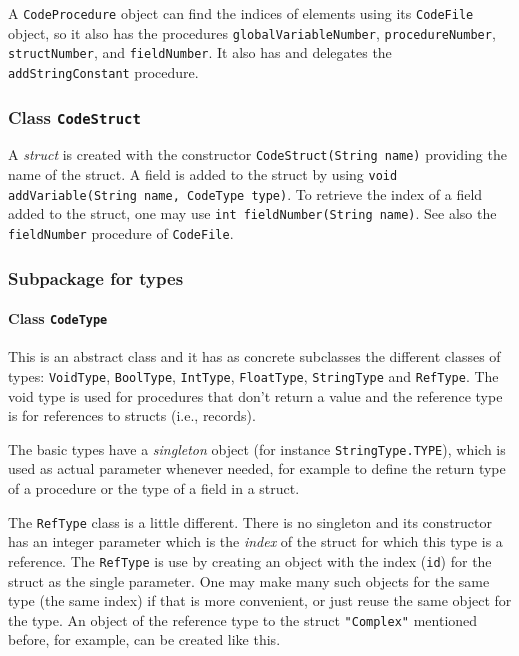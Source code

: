 \documentclass[11pt]{article}
\begin{document}
A \texttt{CodeProcedure} object can find the indices of elements using its
\texttt{CodeFile} object, so it also has the procedures \texttt{globalVariableNumber},
\texttt{procedureNumber}, \texttt{structNumber}, and \texttt{fieldNumber}. It also has and
delegates the \texttt{addStringConstant} procedure.


\subsubsection{Class \texttt{CodeStruct}}
\label{sec:orge892e0f}


A \emph{struct} is created with the constructor \texttt{CodeStruct(String name)}
providing the name of the struct. A field is added to the struct by using
\texttt{void addVariable(String name, CodeType type)}. To retrieve the index of a
field added to the struct, one may use \texttt{int fieldNumber(String name)}. See
also the \texttt{fieldNumber} procedure of \texttt{CodeFile}.


\subsubsection{Subpackage for types}
\label{sec:orga81388e}
\paragraph{Class \texttt{CodeType}}
\label{sec:org95d6079}

This is an abstract class and it has as concrete subclasses the different
classes of types: \texttt{VoidType}, \texttt{BoolType}, \texttt{IntType}, \texttt{FloatType},
\texttt{StringType} and \texttt{RefType}. The void type is used for procedures that don't
return a value and the reference type is for references to structs (i.e.,
records).


The basic types have a \emph{singleton} object (for instance \texttt{StringType.TYPE}),
which is used as actual parameter whenever needed, for example to define
the return type of a procedure or the type of a field in a struct.


The \texttt{RefType} class is a little different. There is no singleton and its
constructor has an integer parameter which is the \emph{index} of the struct for
which this type is a reference. The \texttt{RefType} is use by creating an object
with the index (\texttt{id}) for the struct as the single parameter. One may make
many such objects for the same type (the same index) if that is more
convenient, or just reuse the same object for the type. An object of the
reference type to the struct \texttt{"Complex"} mentioned before, for example, can
be created like this.
\end{document}
